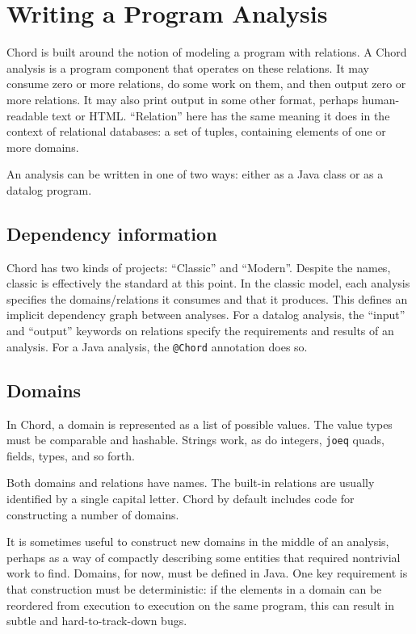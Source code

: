 \section{Writing a Program Analysis}
\label{sec:writing-analysis}

Chord is built around the notion of modeling a program with relations.
A Chord analysis is a program component that operates on these relations.
It may consume zero or more relations, do some work on them, and then output zero or more relations.
It may also print output in some other format, perhaps human-readable text or HTML.
``Relation'' here has the same meaning it does in the context of relational databases: a set of tuples, containing elements of one or more domains.  


An analysis can be written in one of two ways: either as a Java class or as a datalog program. 

\subsection{Dependency information}

Chord has two kinds of projects: ``Classic'' and ``Modern''.  Despite the names, classic is effectively the standard at this point.
In the classic model, each analysis specifies the domains/relations it consumes and that it produces.
This defines an implicit dependency graph between analyses.  For a datalog analysis, the ``input'' and ``output'' keywords on relations specify the requirements and results of an analysis.  For a Java analysis, the \texttt{@Chord} annotation does so. 



\subsection{Domains}

In Chord, a domain is represented as a list of possible values. 
The value types must be comparable and hashable.
Strings work, as do integers, \texttt{joeq} quads, fields, types, and so forth. 
%

Both domains and relations have names. The built-in relations are usually identified by a single capital letter.
Chord by default includes code for constructing a number of domains.

It is sometimes useful to construct new domains in the middle of an analysis, perhaps as a way of compactly describing some entities that required nontrivial work to find. Domains, for now, must be defined in Java. One key requirement is that construction must be deterministic: if the elements in a domain can be reordered from execution to execution on the same program, this can result in subtle and hard-to-track-down bugs.


